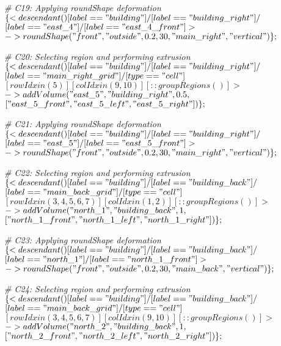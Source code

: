 \noindent \textit{\# C19: Applying roundShape deformation} \\
$\{< descendant() [label=="building"] / [label=="building\_right"] / $\\
$[label=="east\_4"] / [label=="east\_4\_front"] > $\\
$-> roundShape("front", "outside", 0.2, 30, "main\_right", "vertical")\};$

\noindent \textit{\# C20: Selecting region and performing extrusion} \\
$\{< descendant() [label=="building"] / [label=="building\_right"] / $\\
$[label=="main\_right\_grid"] / [type=="cell"] $\\
$[rowIdx in (5)] [colIdx in (9, 10)] [::groupRegions()] > $\\
$-> addVolume("east\_5", "building\_right", 0.5, $\\
$["east\_5\_front", "east\_5\_left", "east\_5\_right"])\};$

\noindent \textit{\# C21: Applying roundShape deformation} \\
$\{< descendant() [label=="building"] / [label=="building\_right"] / $\\
$[label=="east\_5"] / [label=="east\_5\_front"] > $\\
$-> roundShape("front", "outside", 0.2, 30, "main\_right", "vertical")\};$

\noindent \textit{\# C22: Selecting region and performing extrusion} \\
$\{< descendant() [label=="building"] / [label=="building\_back"] / $\\
$[label=="main\_back\_grid"] / [type=="cell"] $\\
$[rowIdx in (3, 4, 5, 6, 7)] [colIdx in (1, 2)] [::groupRegions()] > $\\
$-> addVolume("north\_1", "building\_back", 1, $\\
$["north\_1\_front", "north\_1\_left", "north\_1\_right"])\};$

\noindent \textit{\# C23: Applying roundShape deformation} \\
$\{< descendant() [label=="building"] / [label=="building\_back"] / $\\
$[label=="north\_1"] / [label=="north\_1\_front"] > $\\
$-> roundShape("front", "outside", 0.2, 30, "main\_back", "vertical")\};$

\noindent \textit{\# C24: Selecting region and performing extrusion} \\
$\{< descendant() [label=="building"] / [label=="building\_back"] / $\\
$[label=="main\_back\_grid"] / [type=="cell"] $\\
$[rowIdx in (3, 4, 5, 6, 7)] [colIdx in (9, 10)] [::groupRegions()] > $\\
$-> addVolume("north\_2", "building\_back", 1, $\\
$["north\_2\_front", "north\_2\_left", "north\_2\_right"])\};$

